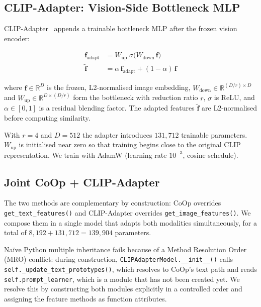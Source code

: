 \documentclass[10pt,twocolumn,letterpaper]{article}
\begin{document}
\subsection{CLIP-Adapter: Vision-Side Bottleneck MLP}\label{sec:adapter}

CLIP-Adapter~\cite{gao2024clipadapter} appends a trainable bottleneck MLP after the frozen vision encoder:

\begin{align}
  \mathbf{f}_{\mathrm{adapt}} &= W_{\mathrm{up}} \;\sigma\bigl(
    W_{\mathrm{down}}\,\mathbf{f}\bigr) \label{eq:adapter-mlp}\\
  \tilde{\mathbf{f}} &= \alpha\,\mathbf{f}_{\mathrm{adapt}}
    + (1-\alpha)\,\mathbf{f} \label{eq:adapter-blend}
\end{align}

where $\mathbf{f} \in \mathbb{R}^D$ is the frozen, L2-normalised image embedding, $W_{\mathrm{down}} \in \mathbb{R}^{(D/r) \times D}$ and $W_{\mathrm{up}} \in \mathbb{R}^{D \times (D/r)}$ form the bottleneck
with reduction ratio $r$, $\sigma$ is ReLU, and $\alpha \in [0, 1]$ is a residual blending factor.
The adapted features $\tilde{\mathbf{f}}$ are L2-normalised before computing similarity.

With $r = 4$ and $D = 512$ the adapter introduces $131{,}712$ trainable parameters. $W_{\mathrm{up}}$ is initialised near zero so that training begins close to the original CLIP representation. We train with AdamW (learning rate $10^{-3}$, cosine schedule).


\subsection{Joint CoOp + CLIP-Adapter}\label{sec:joint}

The two methods are complementary by construction: CoOp overrides \texttt{get\_text\_features()} and CLIP-Adapter overrides \texttt{get\_image\_features()}. We compose them in a single model that adapts both modalities simultaneously, for a total of $8{,}192 + 131{,}712 = 139{,}904$ parameters.

Naïve Python multiple inheritance fails because of a Method Resolution Order (MRO) conflict: during construction,
\texttt{CLIPAdapterModel.\_\_init\_\_()} calls \texttt{self.\_update\_text\_prototypes()}, which resolves to CoOp's text
path and reads \texttt{self.prompt\_learner}, which is a module that has not been created yet. We resolve this by constructing both modules explicitly in a controlled order and assigning the feature methods as function attributes.
\end{document}
